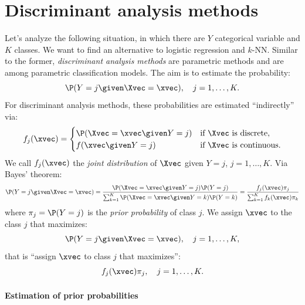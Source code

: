 \section{Discriminant analysis methods}

Let's analyze the following situation, in which there are $Y$ categorical variable and $K$ classes. We want to find an alternative to logistic regression and $k$-NN. Similar to the former, \emph{discriminant analysis methods} are parametric methods and are among parametric classification models. The aim is to estimate the probability:
\begin{equation}
    \P(Y = j \given \Xvec = \xvec),\quad j = 1, \dots, K.
\end{equation}
For discriminant analysis methods, these probabilities are estimated ``indirectly'' via:
\begin{equation}
    f_j(\xvec) = \begin{cases}
        \P(\Xvec = \xvec \given Y = j) & \text{if } \Xvec \text{ is discrete},   \\
        f(\xvec\given Y = j)           & \text{if } \Xvec \text{ is continuous}.
    \end{cases}
\end{equation}
We call $f_j(\xvec)$ the \emph{joint distribution} of $\Xvec$ given $Y = j$, $j = 1, \dots, K$. Via Bayes' theorem:
\begin{equation}
    \P(Y = j \given \Xvec = \xvec) = \frac{\P(\Xvec = \xvec \given Y = j) \P(Y = j)}{\sum_{k=1}^K \P(\Xvec = \xvec \given Y = k) \P(Y = k)} = \frac{f_j(\xvec) \pi_j}{\sum_{k=1}^K f_k(\xvec) \pi_k}
\end{equation}
where $\pi_j = \P(Y = j)$ is the \emph{prior probability} of class $j$. We assign $\xvec$ to the class $j$ that maximizes:
\begin{equation}
    \P(Y = j \given \Xvec = \xvec),\quad j = 1, \ldots, K,
\end{equation}
that is ``assign $\xvec$ to class $j$ that maximizes'':
\begin{equation}
    f_j(\xvec) \pi_j,\quad j = 1, \ldots, K.
\end{equation}

\paragraph{Estimation of prior probabilities}

